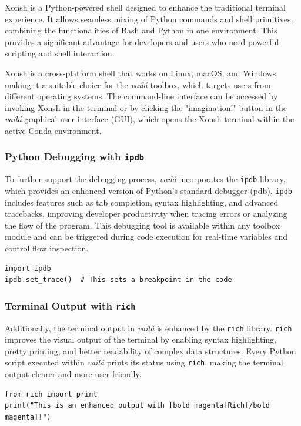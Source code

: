 \documentclass{article}
\begin{document}
Xonsh is a Python-powered shell designed to enhance the traditional terminal experience. It allows seamless mixing of Python commands and shell primitives, combining the functionalities of Bash and Python in one environment. This provides a significant advantage for developers and users who need powerful scripting and shell interaction.

Xonsh is a cross-platform shell that works on Linux, macOS, and Windows, making it a suitable choice for the \textit{vailá} toolbox, which targets users from different operating systems. The command-line interface can be accessed by invoking Xonsh in the terminal or by clicking the "imagination!" button in the \textit{vailá} graphical user interface (GUI), which opens the Xonsh terminal within the active Conda environment.

\subsubsection{Python Debugging with \texttt{ipdb}}

To further support the debugging process, \textit{vailá} incorporates the \texttt{ipdb} library, which provides an enhanced version of Python's standard debugger (pdb). \texttt{ipdb} includes features such as tab completion, syntax highlighting, and advanced tracebacks, improving developer productivity when tracing errors or analyzing the flow of the program. This debugging tool is available within any toolbox module and can be triggered during code execution for real-time variables and control flow inspection.

\begin{verbatim}
import ipdb
ipdb.set_trace()  # This sets a breakpoint in the code
\end{verbatim}

\subsubsection{Terminal Output with \texttt{rich}}

Additionally, the terminal output in \textit{vailá} is enhanced by the \texttt{rich} library. \texttt{rich} improves the visual output of the terminal by enabling syntax highlighting, pretty printing, and better readability of complex data structures. Every Python script executed within \textit{vailá} prints its status using \texttt{rich}, making the terminal output clearer and more user-friendly.

\begin{verbatim}
from rich import print
print("This is an enhanced output with [bold magenta]Rich[/bold magenta]!")
\end{verbatim}
\end{document}
